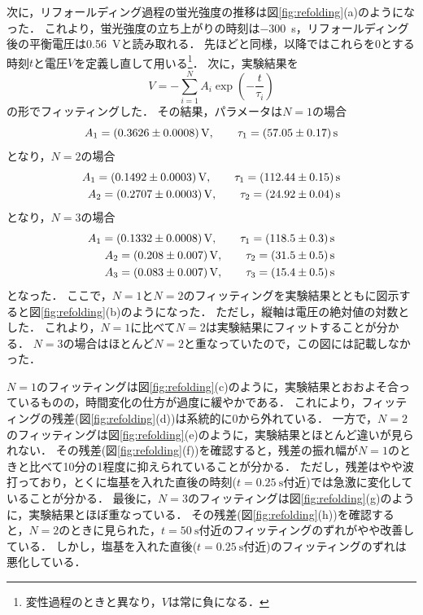 \documentclass[a4paper,11pt, titlepage]{jsarticle}
\begin{document}
次に，リフォールディング過程の蛍光強度の推移は図\ref{fig:refolding}(a)のようになった．
これより，蛍光強度の立ち上がりの時刻は\SI{-300}{\second}，リフォールディング後の平衡電圧は\SI{0.56}{\volt}と読み取れる．
先ほどと同様，以降ではこれらを0とする時刻$t$と電圧$V$を定義し直して用いる\footnote{変性過程のときと異なり，$V$は常に負になる．}．
次に，実験結果を
\begin{equation}
    V = -\sum_{i=1}^{N} A_i \exp(-\frac{t}{\tau_i})
\end{equation}
の形でフィッティングした．
その結果，パラメータは$N=1$の場合
\begin{equation}
    A_1 = \SI[separate-uncertainty]{0.3626\pm 0.0008}{\volt}, \qquad \tau_1 = \SI[separate-uncertainty]{57.05\pm 0.17}{\second}
\end{equation}
となり，$N=2$の場合
\begin{align}
    A_1 = \SI[separate-uncertainty]{0.1492\pm 0.0003}{\volt},\qquad \tau_1 = \SI[separate-uncertainty]{112.44\pm 0.15}{\second}\\
    A_2 = \SI[separate-uncertainty]{0.2707\pm 0.0003}{\volt},\qquad \tau_2 = \SI[separate-uncertainty]{24.92\pm 0.04}{\second}
\end{align}
となり，$N=3$の場合
\begin{align}
    A_1 = \SI[separate-uncertainty]{0.1332\pm 0.0008}{\volt}, \qquad \tau_1 = \SI[separate-uncertainty]{118.5\pm 0.3}{\second}\\
    A_2 = \SI[separate-uncertainty]{0.208\pm 0.007}{\volt}, \qquad \tau_2 = \SI[separate-uncertainty]{31.5\pm 0.5}{\second}\\
    A_3 = \SI[separate-uncertainty]{0.083\pm 0.007}{\volt}, \qquad \tau_3 = \SI[separate-uncertainty]{15.4\pm 0.5}{\second}
\end{align}
となった．
ここで，$N=1$と$N=2$のフィッティングを実験結果とともに図示すると図\ref{fig:refolding}(b)のようになった．
ただし，縦軸は電圧の絶対値の対数とした．
これより，$N=1$に比べて$N=2$は実験結果にフィットすることが分かる．
$N=3$の場合はほとんど$N=2$と重なっていたので，この図には記載しなかった．

$N=1$のフィッティングは図\ref{fig:refolding}(c)のように，実験結果とおおよそ合っているものの，時間変化の仕方が過度に緩やかである．
これにより，フィッティングの残差(図\ref{fig:refolding}(d))は系統的に0から外れている．
一方で，$N=2$のフィッティングは図\ref{fig:refolding}(e)のように，実験結果とほとんど違いが見られない．
その残差(図\ref{fig:refolding}(f))を確認すると，残差の振れ幅が$N=1$のときと比べて10分の1程度に抑えられていることが分かる．
ただし，残差はやや波打っており，とくに塩基を入れた直後の時刻($t=\SI{0.25}{\second}$付近)では急激に変化していることが分かる．
最後に，$N=3$のフィッティングは図\ref{fig:refolding}(g)のように，実験結果とほぼ重なっている．
その残差(図\ref{fig:refolding}(h))を確認すると，$N=2$のときに見られた，$t=\SI{50}{\second}$付近のフィッティングのずれがやや改善している．
しかし，塩基を入れた直後($t=\SI{0.25}{\second}$付近)のフィッティングのずれは悪化している．
\end{document}
